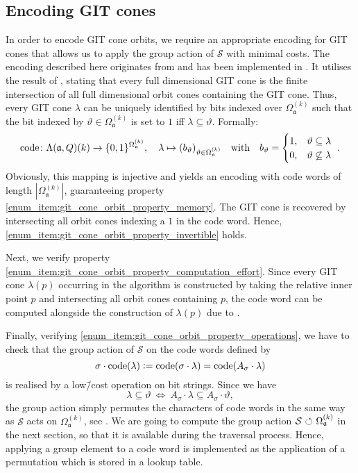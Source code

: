 \subsection*{Encoding GIT cones}
In order to encode GIT cone orbits, we require an appropriate encoding for GIT cones that allows us to apply the group action of $\mathcal{S}$ with minimal costs. The encoding described here originates from \cite[Construction 4.3]{gitfan_symmetry} and has been implemented in \gitfanlib{}. It utilises the result of , stating that every full dimensional GIT cone is the finite intersection of all full dimensional orbit cones containing the GIT cone. Thus, every GIT cone $\lambda$ can be uniquely identified by bits indexed over $\Omega_\mathfrak{a}^{(k)}$ such that the bit indexed by $\vartheta\in\Omega_\mathfrak{a}^{(k)}$ is set to $1$ iff $\lambda \subseteq \vartheta$. Formally:
$$\text{code}\colon \Lambda(\mathfrak{a},Q)(k) \rightarrow \{0,1\}^{\Omega_\mathfrak{a}^{(k)}},\quad
\lambda \mapsto (b_\vartheta)_{\vartheta\in\Omega_\mathfrak{a}^{(k)}}\quad\text{with}\quad
b_\vartheta = 
\begin{cases}
1, & \vartheta\subseteq\lambda \\
0, & \vartheta\not\subseteq\lambda
\end{cases}\ .
$$
Obviously, this mapping is injective and yields an encoding with code words of length $|\Omega_\mathfrak{a}^{(k)}|$, guaranteeing property \ref{enum_item:git_cone_orbit_property_memory}. The GIT cone is recovered by intersecting all orbit cones indexing a $1$ in the code word. Hence, \ref{enum_item:git_cone_orbit_property_invertible} holds.

Next, we verify property \ref{enum_item:git_cone_orbit_property_computation_effort}. Since every GIT cone $\lambda(p)$ occurring in the algorithm is constructed by taking the relative inner point $p$ and intersecting all orbit cones containing $p$, the code word can be computed alongside the construction of $\lambda(p)$ due to .

Finally, verifying \ref{enum_item:git_cone_orbit_property_operations},  we have to check that the group action of $\mathcal{S}$ on the code words defined by
$$\sigma\cdot\text{code}(\lambda) \mathrel{\mathop:}= \text{code}(\sigma\cdot\lambda) = \text{code}(A_\sigma\cdot\lambda)$$
is realised by a low\=/cost operation on bit strings. Since we have
$$\lambda\subseteq\vartheta\ \Leftrightarrow\ A_\sigma\cdot\lambda\subseteq A_\sigma\cdot\vartheta,$$ the group action simply permutes the characters of code words in the same way as $\mathcal{S}$ acts on $\Omega_\mathfrak{a}^{(k)}$, see . We are going to compute the group action $\mathcal{S}{\ \circlearrowleft\ }\Omega_\mathfrak{a}^{(k)}$ in the next section, so that it is available during the traversal process. Hence, applying a group element to a code word is implemented as the application of a permutation which is stored in a lookup table.

